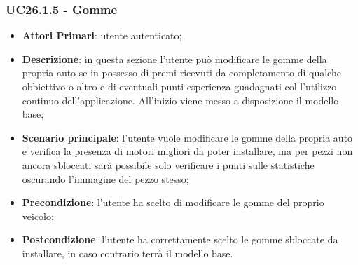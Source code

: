 \subsubsection{UC26.1.5 - Gomme}
\begin{itemize}
	\item \textbf{Attori Primari}: utente autenticato;
	\item \textbf{Descrizione}: in questa sezione l'utente può modificare le gomme della propria auto se in possesso di premi ricevuti da completamento di qualche obbiettivo o altro e di eventuali punti esperienza guadagnati col l'utilizzo continuo dell'applicazione.
	All'inizio viene messo a disposizione il modello base;
	\item \textbf{Scenario principale}: l'utente vuole modificare le gomme della propria auto e verifica la presenza di motori migliori da poter installare, ma per pezzi non ancora sbloccati sarà possibile solo verificare i punti sulle statistiche oscurando l'immagine del pezzo stesso;
	\item \textbf{Precondizione}: l'utente ha scelto di modificare le gomme del proprio veicolo; 
	\item \textbf{Postcondizione}: l'utente ha correttamente scelto le gomme sbloccate da installare, in caso contrario terrà il modello base.
\end{itemize}
\newpage
